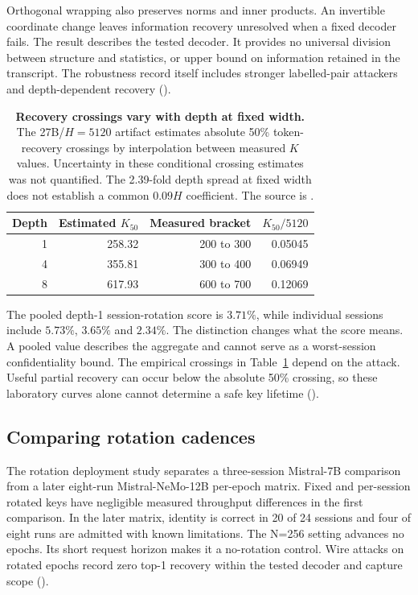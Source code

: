 Orthogonal wrapping also preserves norms and inner products. An invertible
coordinate change leaves information recovery unresolved when a fixed
decoder fails. The result describes the tested decoder. It provides
no universal division between structure and statistics, or upper bound on
information retained in the transcript. The robustness record itself
includes stronger labelled-pair attackers and depth-dependent recovery
().

\begin{table}[t]
\centering\small
\begin{tabular}{@{}rrrr@{}}
\toprule
Depth & Estimated $K_{50}$ & Measured bracket & $K_{50}/5120$ \\
\midrule
1 & 258.32 & 200 to 300 & 0.05045 \\
4 & 355.81 & 300 to 400 & 0.06949 \\
8 & 617.93 & 600 to 700 & 0.12069 \\
\bottomrule
\end{tabular}
\caption{\textbf{Recovery crossings vary with depth at fixed width.}
The 27B/$H=5120$ artifact estimates absolute 50\% token-recovery crossings
by interpolation between measured $K$ values. Uncertainty in these
conditional crossing estimates was not quantified.
The 2.39-fold depth spread at fixed width does not establish a common
$0.09H$ coefficient. The source is .}
\label{tab:k50}
\end{table}

The pooled depth-1 session-rotation score is $3.71\%$, while individual
sessions include $5.73\%$, $3.65\%$ and $2.34\%$. The distinction changes
what the score means. A pooled value describes the aggregate and cannot
serve as a worst-session confidentiality bound. The empirical crossings in Table~\ref{tab:k50}
depend on the attack. Useful partial recovery can occur below the absolute 50\%
crossing, so these laboratory curves alone cannot determine a safe key
lifetime ().

\subsection{Comparing rotation cadences}

The rotation deployment study separates a three-session Mistral-7B
comparison from a later eight-run Mistral-NeMo-12B per-epoch matrix.
Fixed and per-session rotated keys have negligible measured throughput
differences in the first comparison. In the later matrix, identity is
correct in 20 of 24 sessions and four of eight runs are admitted with known
limitations. The N=256 setting advances no epochs. Its short request horizon makes
it a no-rotation control. Wire attacks on rotated epochs
record zero top-1 recovery within the tested decoder and capture scope
().

